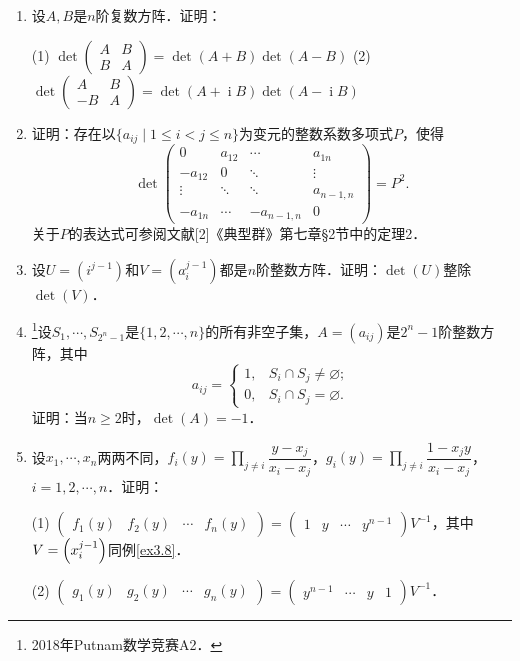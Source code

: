 \documentclass[a4paper,fontset=windows]{ctexbook}
\theoremstyle{definition}
\DeclareMathOperator{\I}{i}
\renewcommand{\le}{\leqslant}
\renewcommand{\ge}{\geqslant}
\begin{document}
\begin{enumerate}
\item 设$A,B$是$n$阶复数方阵．证明：

(1) $\det\begin{pmatrix}A&B \\ B&A\end{pmatrix}=\det(A+B)\det(A-B)$ \qquad
(2) $\det\begin{pmatrix}A&B \\ -B&A\end{pmatrix}=\det(A+\I B)\det(A-\I B)$

\item 证明：存在以$\{a_{ij}\mid 1\le i<j\le n\}$为变元的整数系数多项式$P$，使得
$$\det\begin{pmatrix}0&a_{12}&\cdots&a_{1n} \\ -a_{12}&0&\ddots&\vdots \\ \vdots&\ddots&\ddots&a_{n-1,n} \\ -a_{1n}&\cdots&-a_{n-1,n}&0\end{pmatrix}=P^2.$$
关于$P$的表达式可参阅文献[2]《典型群》第七章\S 2节中的定理2．

\item 设$U=(i^{j-1})$和$V=(a_i^{j-1})$都是$n$阶整数方阵．证明：$\det(U)$整除$\det(V)$．

\item \footnote{2018年Putnam数学竞赛A2．}设$S_1,\cdots,S_{2^n-1}$是$\{1,2,\cdots,n\}$的所有非空子集，$A=(a_{ij})$是$2^n-1$阶整数方阵，其中
$$a_{ij}=\begin{cases}1,&S_i\cap S_j\ne\varnothing; \\ 0,&S_i\cap S_j=\varnothing.\end{cases}$$
证明：当$n\ge 2$时，$\det(A)=-1$．

\item 设$x_1,\cdots,x_n$两两不同，$f_i(y)=\prod\limits_{j\ne i}\dfrac{y-x_j}{x_i-x_j}$，$g_i(y)=\prod\limits_{j\ne i}\dfrac{1-x_jy}{x_i-x_j}$，$i=1,2,\cdots,n$．证明：

(1) $\begin{pmatrix}f_1(y)&f_2(y)&\cdots&f_n(y)\end{pmatrix}=\begin{pmatrix}1&y&\cdots&y^{n-1}\end{pmatrix}V^{-1}$，其中$V=\Bigl(x_i^{j-1}\Bigr)$同例\ref{ex3.8}．

(2) $\begin{pmatrix}g_1(y)&g_2(y)&\cdots&g_n(y)\end{pmatrix}=\begin{pmatrix}y^{n-1}&\cdots&y&1\end{pmatrix}V^{-1}$．


\end{enumerate}
\end{document}
